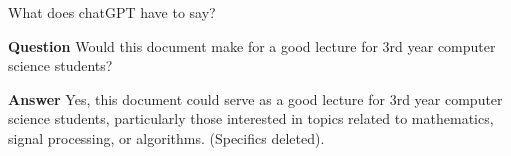\documentclass[portrait,fleqn,12pt]{beamer}
\begin{document}
    \begin{frame}{What does chatGPT have to say?}
    
    \textbf{Question} Would this document make for a good lecture for 3rd year computer science students?
    
    \textbf{Answer} Yes, this document could serve as a good lecture for 3rd year computer science students, particularly those interested in topics related to mathematics, signal processing, or algorithms.  (Specifics deleted).
    
    \end{frame}
\end{document}
